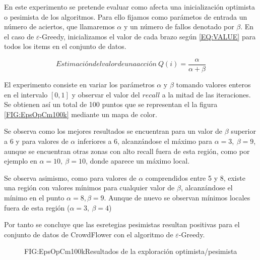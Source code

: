 En este experimento se pretende evaluar como afecta una inicialización optimista o pesimista de los algoritmos. Para ello fijamos como parámetos de entrada un número de aciertos, que llamaremos $\alpha$ y un número de fallos denotado por $\beta$. En el caso de $\varepsilon$-Greedy, inicializamos el valor de cada brazo según \ref{EQ:VALUE} para todos los items en el conjunto de datos.

\begin{equation}[EQ:VALUE]{Estimación del valor de una acción}
    \ Q(i) = \dfrac{\alpha}{\alpha + \beta}
\end{equation}

El experimento consiste en variar los parámetros $\alpha$ y $\beta$ tomando valores enteros en el intervalo $[0,1]$ y observar el valor del $recall$ a la mitad de las iteraciones. Se obtienen así un total de 100 puntos que se representan el la figura \ref{FIG:EpsOpCm100k} mediante un mapa de color. 

Se observa como los mejores resultados se encuentran para un valor de $\beta$ superior a 6 y para valores de $\alpha$ inferiores a 6, alcanzándose el máximo para $\alpha=3, \ \beta=9$, aunque se encuentran otras zonas con alto recall fuera de esta región, como por ejemplo en $\alpha=10, \ \beta=10$, donde aparece un máximo local.

Se observa asimismo, como para valores de $\alpha$ comprendidos entre 5 y 8, existe una región con valores mínimos para cualquier valor de $\beta$, alcanzándose el mínimo en el punto $\alpha=8, \beta=9$. Aunque de nuevo se observan mínimos locales fuera de esta región ($\alpha=3, \  \beta=4$)

Por tanto se concluye que las esretegias pesimistas resultan positivas para el conjunto de datos de CrowdFlower con el algoritmo de $\varepsilon$-Greedy.

\begin{figure}[Mapa de color de $\varepsilon$-Greedy]{FIG:EpsOpCm100k}{Resultados de la exploración optimista/pesimista}
\end{figure}

